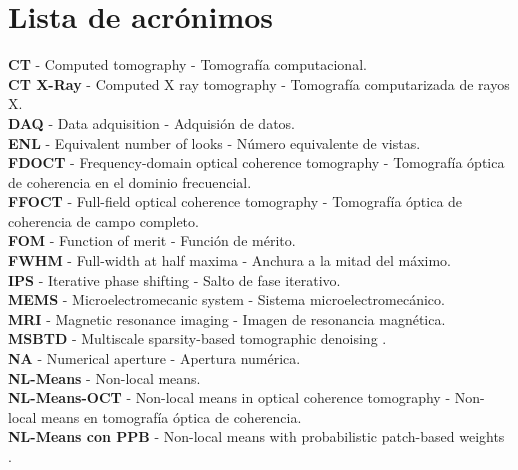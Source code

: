 \tableofcontents
\newpage
\listoffigures

\newpage
\chapter*{Lista de acrónimos}
\thispagestyle{plain}
\noindent\textbf{CT} - Computed tomography - Tomografía computacional.\\ 
\textbf{CT X-Ray} - Computed X ray tomography - Tomografía computarizada de rayos X.\\
\textbf{DAQ} - Data adquisition - Adquisión de datos.\\ 
\textbf{ENL} - Equivalent number of looks - Número equivalente de vistas.\\
\textbf{FDOCT} - Frequency-domain optical coherence tomography - Tomografía óptica de coherencia en el dominio frecuencial.\\ 
\textbf{FFOCT} - Full-field optical coherence tomography - Tomografía óptica de coherencia de campo completo.\\ 
\textbf{FOM} - Function of merit - Función de mérito.\\
\textbf{FWHM} - Full-width at half maxima - Anchura a la mitad del máximo.\\ 
\textbf{IPS} - Iterative phase shifting - Salto de fase iterativo.\\
\textbf{MEMS} - Microelectromecanic system - Sistema microelectromecánico.\\
\textbf{MRI} - Magnetic resonance imaging - Imagen de resonancia magnética.\\ 
\textbf{MSBTD} - Multiscale sparsity-based tomographic denoising .\\ 
\textbf{NA} - Numerical aperture - Apertura numérica.\\ 
\textbf{NL-Means} - Non-local means.\\ 
\textbf{NL-Means-OCT} - Non-local means in optical coherence tomography - Non-local means en tomografía óptica de coherencia.\\ 
\textbf{NL-Means con PPB} - Non-local means with probabilistic patch-based weights .\\
